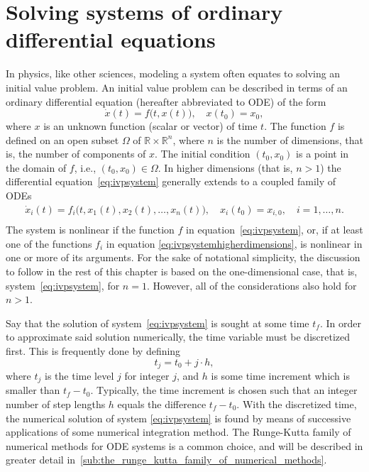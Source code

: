 \section[Solving systems of ordinary differential equations]%
{Solving systems of ordinary differential eq\hspace{0em}uations}
\label{sec:solvingsystems}

In physics, like other sciences, modeling a system often equates to solving
an initial value problem. An initial value problem can be described in terms
of an ordinary differential equation (hereafter abbreviated to ODE) of the form
\begin{equation}
    \label{eq:ivpsystem}
    \dot{x}(t) = f\big(t,x(t)\big),\quad{}x(t_{0})=x_{0},
\end{equation}
where $x$ is an unknown function (scalar or vector) of time $t$. The function
$f$ is defined on an open subset $\Omega$ of $\mathbb{R}\times\mathbb{R}^{n}$,
where $n$ is the number of dimensions, that is, the number of components
of $x$. The initial condition $(t_{0},x_{0})$ is a point in the domain of $f$, i.e.,
$(t_{0},x_{0})\in\Omega$. In higher dimensions (that is, $n>1$) the
differential equation~\eqref{eq:ivpsystem} generally extends to a coupled
family of ODEs
\begin{equation}
\label{eq:ivpsystemhigherdimensions}
\begin{gathered}
    \dot{x}_{i}(t) = f_{i}\big(t,x_{1}(t),x_{2}(t),\ldots,x_{n}(t)\big),\quad
    x_{i}(t_{0})=x_{i,0},\quad{}i=1,\ldots,n. \\
\end{gathered}
\end{equation}
The system is nonlinear if the function $f$ in equation~\eqref{eq:ivpsystem},
or, if at least one of the functions $f_{i}$ in equation
\eqref{eq:ivpsystemhigherdimensions}, is nonlinear in one or more of its
arguments. For the sake of notational simplicity, the discussion to follow
in the rest of this chapter is based on the one-dimensional case, that is,
system~\eqref{eq:ivpsystem}, for $n=1$. However, all of the considerations also
hold for $n>1$.

Say that the solution of system~\eqref{eq:ivpsystem} is sought at some time
$t_{f}$. In order to approximate said solution numerically, the time variable
must be discretized first. This is frequently done by defining
\begin{equation}
    \label{eq:discretetime}
    t_{j} = t_{0}+j\cdot{}h,
\end{equation}
where $t_{j}$ is the time level $j$ for integer $j$, and $h$ is some time
increment which is smaller than $t_{f}-t_{0}$. Typically, the time increment
is chosen such that an integer number of step lengths $h$ equals the difference
$t_{f}-t_{0}$. With the discretized time, the numerical solution of system
\eqref{eq:ivpsystem} is found by means of successive applications of some
numerical integration method. The Runge-Kutta family of numerical
methods for ODE systems is a common choice, and will be described in
greater detail in~\cref{sub:the_runge_kutta_family_of_numerical_methods}.


